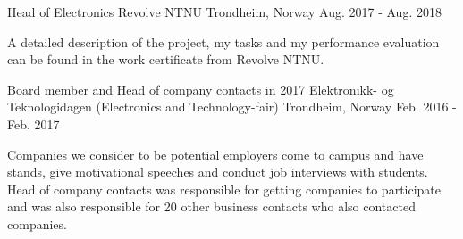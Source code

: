 \begin{cventries}
   \cventry
    {Head of Electronics}
    {Revolve NTNU}
    {Trondheim, Norway}
    {Aug. 2017 - Aug. 2018}
    {
      \begin{cvitems}
        \item {A detailed description of the project, my tasks and my performance evaluation can be found in the work certificate from Revolve NTNU.}
      \end{cvitems}
    }
  \cventry
    {Board member and Head of company contacts in 2017}
    {Elektronikk- og Teknologidagen (Electronics and Technology-fair)}
    {Trondheim, Norway}
    {Feb. 2016 - Feb. 2017}
    {
      \begin{cvitems}
        \item {Companies we consider to be potential employers come to campus and have stands, give motivational speeches and conduct job interviews with students. Head of company contacts was responsible for getting companies to participate and was also responsible for 20 other business contacts who also contacted companies.}
      \end{cvitems}
    }
\end{cventries}
